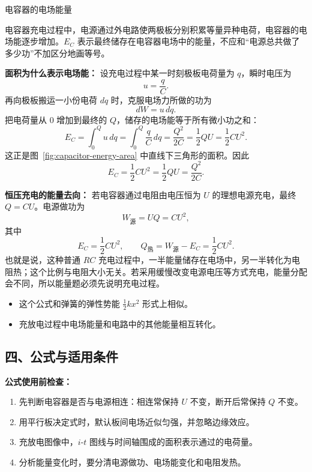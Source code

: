 \begin{conceptbox}{电容器的电场能量}

电容器充电过程中，电源通过外电路使两极板分别积累等量异种电荷，电容器的电场能逐步增加。$E_C$ 表示最终储存在电容器电场中的能量，不应和“电源总共做了多少功”不加区分地画等号。

\begin{center}


\label{fig:capacitor-energy-area}
\end{center}

\textbf{面积为什么表示电场能：} 设充电过程中某一时刻极板电荷量为 $q$，瞬时电压为
\[
u=\frac{q}{C}.
\]
再向极板搬运一小份电荷 $dq$ 时，克服电场力所做的功为
\[
dW=u\,dq.
\]
把电荷量从 $0$ 增加到最终的 $Q$，储存的电场能等于所有微小功之和：
\[
E_C=\int_0^Q u\,dq
=\int_0^Q\frac{q}{C}\,dq
=\frac{Q^2}{2C}
=\frac12QU
=\frac12CU^2.
\]
这正是图~\ref{fig:capacitor-energy-area} 中直线下三角形的面积。因此
\[
\boxed{E_C = \frac12 CU^2 = \frac12 QU = \frac{Q^2}{2C}}.
\]

\textbf{恒压充电的能量去向：} 若电容器通过电阻由电压恒为 $U$ 的理想电源充电，最终 $Q=CU$。电源做功为
\[
W_{\text{源}}=UQ=CU^2,
\]
其中
\[
E_C=\frac12CU^2,
\qquad
Q_{\text{热}}=W_{\text{源}}-E_C=\frac12CU^2.
\]
也就是说，这种普通 $RC$ 充电过程中，一半能量储存在电场中，另一半转化为电阻热；这个比例与电阻大小无关。若采用缓慢改变电源电压等方式充电，能量分配会不同，所以能量题必须先说明充电过程。

\begin{itemize}
  \item 这个公式和弹簧的弹性势能 $\frac12 kx^2$ 形式上相似。
  \item 充放电过程中电场能量和电路中的其他能量相互转化。
\end{itemize}

\end{conceptbox}

\begin{samepage}
\section*{四、公式与适用条件}

\textbf{公式使用前检查：}
\nopagebreak[4]
\begin{enumerate}
  \item 先判断电容器是否与电源相连：相连常保持 $U$ 不变，断开后常保持 $Q$ 不变。
  \item 用平行板决定式时，默认板间电场近似匀强，并忽略边缘效应。
  \item 充放电图像中，$i$-$t$ 图线与时间轴围成的面积表示通过的电荷量。
  \item 分析能量变化时，要分清电源做功、电场能变化和电阻发热。
\end{enumerate}
\end{samepage}

